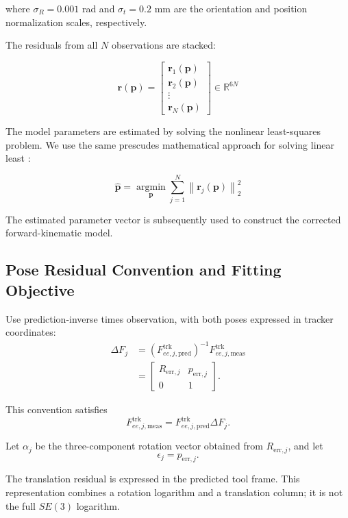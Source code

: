 \documentclass[11pt,letterpaper]{article}
\begin{document}
where $\sigma_R=0.001$ rad and
$\sigma_t=0.2$ mm are the orientation and
position normalization scales, respectively.

The residuals from all $N$ observations are stacked:

\begin{equation}
\mathbf{r}(\mathbf{p})
=
\begin{bmatrix}
\mathbf{r}_1(\mathbf{p})\\
\mathbf{r}_2(\mathbf{p})\\
\vdots\\
\mathbf{r}_N(\mathbf{p})
\end{bmatrix}
\in\mathbb{R}^{6N}
\end{equation}

The model parameters are estimated by solving
the nonlinear least-squares problem. We use the same prescudes mathematical approach for solving linear least :

\begin{equation}
\boxed{
\hat{\mathbf{p}}
=
\underset{\mathbf{p}}{\operatorname{argmin}}
\sum_{j=1}^{N}
\left\|\mathbf{r}_j(\mathbf{p})\right\|_2^2
}
\end{equation}

The estimated parameter vector is subsequently used
to construct the corrected forward-kinematic model.


\subsection{Pose Residual Convention and Fitting Objective}

Use prediction-inverse times observation, with both
poses expressed in tracker coordinates:
\[
\begin{aligned}
\Delta F_j
&=
\left(
F_{ee,j,\mathrm{pred}}^{\mathrm{trk}}
\right)^{-1}
F_{ee,j,\mathrm{meas}}^{\mathrm{trk}}\\
&=
\begin{bmatrix}
R_{\mathrm{err},j}&p_{\mathrm{err},j}\\
0&1
\end{bmatrix}.
\end{aligned}
\]

This convention satisfies
\[
F_{ee,j,\mathrm{meas}}^{\mathrm{trk}}
=
F_{ee,j,\mathrm{pred}}^{\mathrm{trk}}
\Delta F_j.
\]

Let $\alpha_j$ be the three-component rotation vector
obtained from $R_{\mathrm{err},j}$, and let
\[
\epsilon_j=p_{\mathrm{err},j}.
\]

The translation residual is expressed in the
predicted tool frame. This representation combines
a rotation logarithm and a translation column;
it is not the full $SE(3)$ logarithm.
\end{document}
